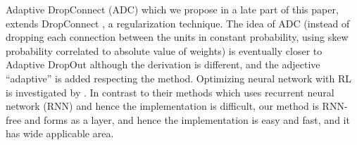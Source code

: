 Adaptive DropConnect (ADC) which we propose in a late part of this paper, extends DropConnect \citep{wan2013regularization}, a regularization technique.
The idea of ADC (instead of dropping each connection between the units in constant probability, using skew probability correlated to absolute value of weights) is eventually closer to Adaptive DropOut \citep{ba2013adaptive} although the derivation is different, 
and the adjective ``adaptive'' is added respecting the method.
Optimizing neural network with RL is investigated by \cite{andrychowicz2016learning}.
In contrast to their methods which uses recurrent neural network (RNN) and hence the implementation is difficult,
our method is RNN-free and forms as a layer, and hence the implementation is easy and fast, and it has wide applicable area.

